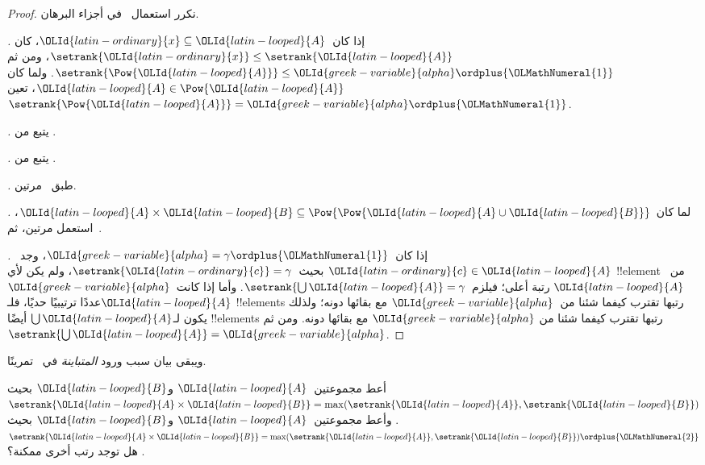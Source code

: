 \documentclass[../../../include/open-logic-section]{subfiles}
\begin{document}
\begin{proof}
نكرر استعمال~ في أجزاء البرهان.

\emph{.} إذا كان~${\OLId{latin-ordinary}{x}} \subseteq {\OLId{latin-looped}{A}}$، كان
$\setrank{{\OLId{latin-ordinary}{x}}} \leq \setrank{{\OLId{latin-looped}{A}}}$، ومن ثم
$\setrank{\Pow{{\OLId{latin-looped}{A}}}} \leq {\OLId{greek-variable}{alpha}} \ordplus {\OLMathNumeral{1}}$. ولما كان
${\OLId{latin-looped}{A}} \in \Pow{{\OLId{latin-looped}{A}}}$، تعين~$\setrank{\Pow{{\OLId{latin-looped}{A}}}} = {\OLId{greek-variable}{alpha}} \ordplus {\OLMathNumeral{1}}$.

\emph{.} يتبع من
.

\emph{.} يتبع من
.

\emph{.} طبق~ مرتين.

\emph{.} لما كان
${\OLId{latin-looped}{A}} \times {\OLId{latin-looped}{B}} \subseteq \Pow{\Pow{{\OLId{latin-looped}{A}} \cup {\OLId{latin-looped}{B}}}}$، استعمل
 مرتين، ثم~.

\emph{.} إذا كان~${\OLId{greek-variable}{alpha}} = \gamma\ordplus {\OLMathNumeral{1}}$،
وجد~${\OLId{latin-ordinary}{c}} \in {\OLId{latin-looped}{A}}$ بحيث~$\setrank{{\OLId{latin-ordinary}{c}}} = \gamma$، ولم يكن لأي
!!{element} من~${\OLId{latin-looped}{A}}$ رتبة أعلى؛ فيلزم~$\setrank{\bigcup {\OLId{latin-looped}{A}}} = \gamma$.
وأما إذا كانت~${\OLId{greek-variable}{alpha}}$ عددًا ترتيبيًا حديًا، فلـ${\OLId{latin-looped}{A}}$ !!{element}s
رتبها تقترب كيفما شئنا من~${\OLId{greek-variable}{alpha}}$ مع بقائها دونه؛ ولذلك يكون
لـ$\bigcup {\OLId{latin-looped}{A}}$ أيضًا !!{element}s رتبها تقترب كيفما شئنا من
${\OLId{greek-variable}{alpha}}$ مع بقائها دونه. ومن ثم~$\setrank{\bigcup {\OLId{latin-looped}{A}}} = {\OLId{greek-variable}{alpha}}$.
\end{proof}
\noindent
ويبقى بيان سبب ورود \emph{المتباينة} في~ تمرينًا.

\begin{prob}
أعط مجموعتين~${\OLId{latin-looped}{A}}$ و${\OLId{latin-looped}{B}}$ بحيث
$\setrank{{\OLId{latin-looped}{A}} \times {\OLId{latin-looped}{B}}} =
\max(\setrank{{\OLId{latin-looped}{A}}}, \setrank{{\OLId{latin-looped}{B}}})$. وأعط مجموعتين~${\OLId{latin-looped}{A}}$ و${\OLId{latin-looped}{B}}$ بحيث
$\setrank{{\OLId{latin-looped}{A}} \times {\OLId{latin-looped}{B}}} =
\max(\setrank{{\OLId{latin-looped}{A}}}, \setrank{{\OLId{latin-looped}{B}}}) \ordplus {\OLMathNumeral{2}}$. هل توجد رتب أخرى ممكنة؟
\end{prob}
\end{document}
